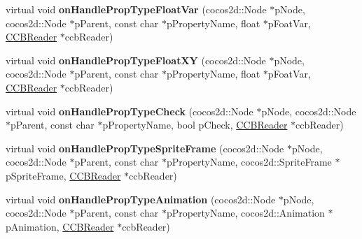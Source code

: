 \begin{DoxyCompactItemize}
\item 
\mbox{\label{classcocosbuilder_1_1NodeLoader_ad6c95f38267b67f68d3f8490249a979d}} 
virtual void {\bfseries on\+Handle\+Prop\+Type\+Float\+Var} (cocos2d\+::\+Node $\ast$p\+Node, cocos2d\+::\+Node $\ast$p\+Parent, const char $\ast$p\+Property\+Name, float $\ast$p\+Foat\+Var, \hyperlink{classcocosbuilder_1_1CCBReader}{C\+C\+B\+Reader} $\ast$ccb\+Reader)
\item 
\mbox{\label{classcocosbuilder_1_1NodeLoader_a5bb4830fa70ef85748f16a4b44ad9902}} 
virtual void {\bfseries on\+Handle\+Prop\+Type\+Float\+XY} (cocos2d\+::\+Node $\ast$p\+Node, cocos2d\+::\+Node $\ast$p\+Parent, const char $\ast$p\+Property\+Name, float $\ast$p\+Foat\+Var, \hyperlink{classcocosbuilder_1_1CCBReader}{C\+C\+B\+Reader} $\ast$ccb\+Reader)
\item 
\mbox{\label{classcocosbuilder_1_1NodeLoader_a673337c21704ada89f812da20addae09}} 
virtual void {\bfseries on\+Handle\+Prop\+Type\+Check} (cocos2d\+::\+Node $\ast$p\+Node, cocos2d\+::\+Node $\ast$p\+Parent, const char $\ast$p\+Property\+Name, bool p\+Check, \hyperlink{classcocosbuilder_1_1CCBReader}{C\+C\+B\+Reader} $\ast$ccb\+Reader)
\item 
\mbox{\label{classcocosbuilder_1_1NodeLoader_aa95cc78ff14122c1b4ff1b2e4bfa5df4}} 
virtual void {\bfseries on\+Handle\+Prop\+Type\+Sprite\+Frame} (cocos2d\+::\+Node $\ast$p\+Node, cocos2d\+::\+Node $\ast$p\+Parent, const char $\ast$p\+Property\+Name, cocos2d\+::\+Sprite\+Frame $\ast$p\+Sprite\+Frame, \hyperlink{classcocosbuilder_1_1CCBReader}{C\+C\+B\+Reader} $\ast$ccb\+Reader)
\item 
\mbox{\label{classcocosbuilder_1_1NodeLoader_a0543b0d2a2505fb809ee0ce3f5b953df}} 
virtual void {\bfseries on\+Handle\+Prop\+Type\+Animation} (cocos2d\+::\+Node $\ast$p\+Node, cocos2d\+::\+Node $\ast$p\+Parent, const char $\ast$p\+Property\+Name, cocos2d\+::\+Animation $\ast$p\+Animation, \hyperlink{classcocosbuilder_1_1CCBReader}{C\+C\+B\+Reader} $\ast$ccb\+Reader)
\item 
\mbox{\label{classcocosbuilder_1_1NodeLoader_a2e80a7221edc8de1da7a742eaeadc3e5}} 

\end{DoxyCompactItemize}
